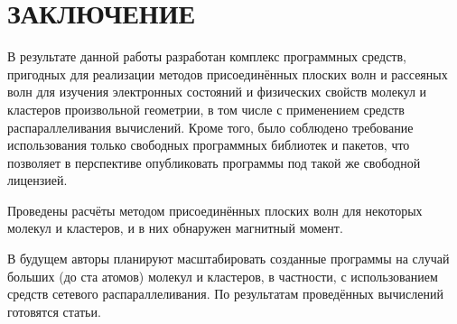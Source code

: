 \chapter*{ЗАКЛЮЧЕНИЕ}                       %

В результате данной работы разработан комплекс программных средств, пригодных для реализации методов присоединённых
плоских волн и рассеяных волн для изучения электронных состояний и физических свойств молекул и кластеров произвольной
геометрии, в том числе с применением средств распараллеливания вычислений. Кроме того, было соблюдено требование
использования только свободных программных библиотек и пакетов, что позволяет в перспективе опубликовать программы
под такой же свободной лицензией.

Проведены расчёты методом присоединённых плоских волн для некоторых молекул и кластеров, и в них обнаружен магнитный
момент.

В будущем авторы планируют масштабировать созданные программы на случай больших (до ста атомов) молекул и кластеров,
в частности, с использованием средств сетевого распараллеливания. По результатам проведённых вычислений готовятся
статьи.


% 
%

\FloatBarrier
